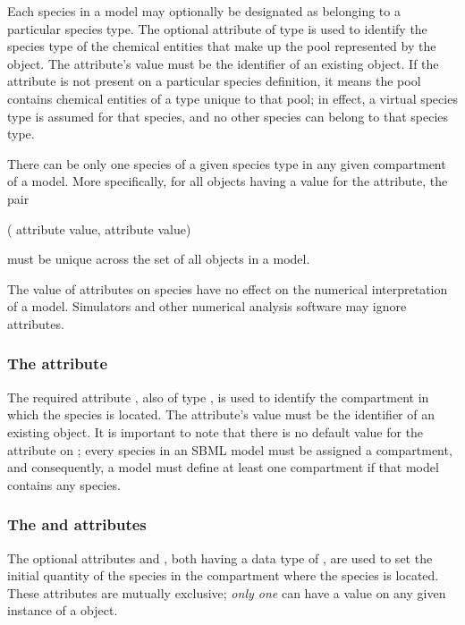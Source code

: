 Each species in a model may optionally be designated as belonging
to a particular species type.  The optional attribute
 of type  is used to identify the
species type of the chemical entities that make up the pool
represented by the \Species object. The attribute's value must be
the identifier of an existing \SpeciesType object.  If the
 attribute is not present on a particular species
definition, it means the pool contains chemical entities of a type
unique to that pool; in effect, a virtual species type is assumed
for that species, and no other species can belong to that species
type.

There can be only one species of a given species type in any given
compartment of a model.  More specifically, for all \Species
objects having a value for the  attribute, the
pair
\begin{center}
( attribute value,  attribute value)
\end{center}
must be unique across the set of all \Species objects
in a model.

The value of  attributes on species have no
effect on the numerical interpretation of a model. Simulators and
other numerical analysis software may ignore 
attributes.




\subsubsection{The  attribute}
\label{sec:species-compartment}

The required attribute , also of type
, is used to identify the compartment in which the
species is located.  The attribute's value must be the identifier of
an existing \Compartment object.  It is important to note that
there is no default value for the  attribute on
\Species; every species in an SBML model must be assigned a
compartment, and consequently, a model must define at least one
compartment if that model contains any species.


\subsubsection{The  and
   attributes}
\label{sec:initialAmount}

The optional attributes  and
, both having a data type of
, are used to set the initial quantity of the
species in the compartment where the species is located.  These
attributes are mutually exclusive; \ie \emph{only one} can have a
value on any given instance of a \Species object.

